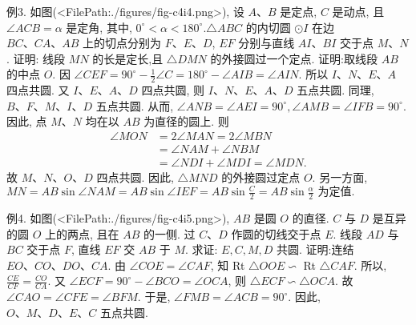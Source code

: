 例3. 如图(<FilePath:./figures/fig-c4i4.png>), 设 $A 、 B$ 是定点, $C$ 是动点, 且 $\angle A C B=\alpha$ 是定角, 其中, $0^{\circ}<\alpha<180^{\circ} . \triangle A B C$ 的内切圆 $\odot I$ 在边 $B C 、 C A 、 A B$ 上的切点分别为 $F 、 E 、 D$, $E F$ 分别与直线 $A I 、 B I$ 交于点 $M 、 N$. 证明: 线段 $M N$ 的长是定长,且 $\triangle D M N$ 的外接圆过一个定点.
证明:取线段 $A B$ 的中点 $O$.
因 $\angle C E F=90^{\circ}-\frac{1}{2} \angle C=180^{\circ}-\angle A I B= \angle A I N$.
所以 $I 、 N 、 E 、 A$ 四点共圆.
又 $I 、 E 、 A 、 D$ 四点共圆, 则 $I 、 N 、 E 、 A 、 D$ 五点共圆.
同理, $B 、 F 、 M 、 I 、 D$ 五点共圆.
从而, $\angle A N B=\angle A E I=90^{\circ}, \angle A M B=\angle I F B=90^{\circ}$.
因此, 点 $M 、 N$ 均在以 $A B$ 为直径的圆上.
则
$$
\begin{aligned}
\angle M O N & =2 \angle M A N=2 \angle M B N \\
& =\angle N A M+\angle N B M \\
& =\angle N D I+\angle M D I=\angle M D N .
\end{aligned}
$$
故 $M 、 N 、 O 、 D$ 四点共圆.
因此, $\triangle M N D$ 的外接圆过定点 $O$.
另一方面, $M N=A B \sin \angle N A M=A B \sin \angle I E F=A B \sin \frac{C}{2}=A B \sin \frac{\alpha}{2} \text { 为定值.
}$



例4. 如图(<FilePath:./figures/fig-c4i5.png>), $A B$ 是圆 $O$ 的直径.
$C$ 与 $D$ 是互异的圆 $O$ 上的两点, 且在 $A B$ 的一侧.
过 $C 、 D$ 作圆的切线交于点 $E$. 线段 $A D$ 与 $B C$ 交于点 $F$, 直线 $E F$ 交 $A B$ 于 $M$. 求证: $E, C, M, D$ 共圆.
证明:连结 $E O 、 C O 、 D O 、 C A$. 由 $\angle C O E= \angle C A F$, 知 Rt $\triangle O O E \backsim$ Rt $\triangle C A F$.
所以, $\frac{C E}{C F}=\frac{C O}{C A}$. 又 $\angle E C F=90^{\circ}-\angle B C O=\angle O C A$,
则 $\triangle E C F \backsim \triangle O C A$.
故 $\angle C A O=\angle C F E=\angle B F M$. 于是, $\angle F M B=\angle A C B=90^{\circ}$.
因此, $O 、 M 、 D 、 E 、 C$ 五点共圆.



